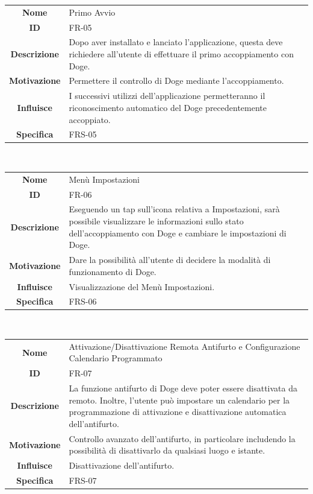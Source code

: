 \documentclass{article}
\begin{document}
    \begin{adjustbox}{center}
    \begin{tabular}{|c|p{10cm}|}
    \hline
    \textbf{Nome} & Primo Avvio \\
    \textbf{ID} & FR-05 \\
    \textbf{Descrizione} & Dopo aver installato e lanciato l'applicazione, questa deve richiedere all'utente di effettuare il primo accoppiamento con Doge. \\
    \textbf{Motivazione} & Permettere il controllo di Doge mediante l'accoppiamento. \\
    \textbf{Influisce} & I successivi utilizzi dell'applicazione permetteranno il riconoscimento automatico del Doge precedentemente accoppiato. \\
    \textbf{Specifica} & FRS-05 \\
    \hline
    \end{tabular}
    \end{adjustbox}
    
    ~
    
    \begin{adjustbox}{center}
    \begin{tabular}{|c|p{10cm}|}
    \hline
    \textbf{Nome} & Menù Impostazioni \\
    \textbf{ID} & FR-06 \\
    \textbf{Descrizione} & Eseguendo un tap sull'icona relativa a Impostazioni, sarà possibile visualizzare le informazioni sullo stato dell'accoppiamento con Doge e cambiare le impostazioni di Doge. \\
    \textbf{Motivazione} & Dare la possibilità all'utente di decidere la modalità di funzionamento di Doge. \\
    \textbf{Influisce} & Visualizzazione del Menù Impostazioni. \\
    \textbf{Specifica} & FRS-06 \\
    \hline
    \end{tabular}
    \end{adjustbox}
    
    ~
    
    \begin{adjustbox}{center}
    \begin{tabular}{|c|p{10cm}|}
    \hline
    \textbf{Nome} & Attivazione/Disattivazione Remota Antifurto e Configurazione Calendario Programmato \\
    \textbf{ID} & FR-07 \\
    \textbf{Descrizione} & La funzione antifurto di Doge deve poter essere disattivata da remoto. Inoltre, l'utente può impostare un calendario per la programmazione di attivazione e disattivazione automatica dell'antifurto. \\
    \textbf{Motivazione} & Controllo avanzato dell'antifurto, in particolare includendo la possibilità di disattivarlo da qualsiasi luogo e istante. \\
    \textbf{Influisce} & Disattivazione dell'antifurto. \\
    \textbf{Specifica} & FRS-07 \\
    \hline
    \end{tabular}
    \end{adjustbox}
    
\end{document}
